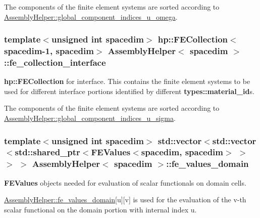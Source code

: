 The components of the finite element systems are sorted according to \hyperlink{class_assembly_helper_a6dae4b6ae7934eaec1ad7baff258ce6e}{Assembly\+Helper\+::global\+\_\+component\+\_\+indices\+\_\+u\+\_\+omega}. 
\subsubsection[{\texorpdfstring{fe\+\_\+collection\+\_\+interface}{fe_collection_interface}}]{\setlength{\rightskip}{0pt plus 5cm}template$<$unsigned int spacedim$>$ {\bf hp\+::\+F\+E\+Collection}$<$spacedim-\/1, spacedim$>$ {\bf Assembly\+Helper}$<$ spacedim $>$\+::fe\+\_\+collection\+\_\+interface\hspace{0.3cm}{\ttfamily [private]}}\hypertarget{class_assembly_helper_a8b4d224a9ecd2e926a8860829874d2a1}{}\label{class_assembly_helper_a8b4d224a9ecd2e926a8860829874d2a1}
{\bf hp\+::\+F\+E\+Collection} for interface. This contains the finite element systems to be used for different interface portions identified by different {\bf types\+::material\+\_\+id}s.

The components of the finite element systems are sorted according to \hyperlink{class_assembly_helper_a992a53a1fcac8a393ca53fb8d504bdfe}{Assembly\+Helper\+::global\+\_\+component\+\_\+indices\+\_\+u\+\_\+sigma}. 
\subsubsection[{\texorpdfstring{fe\+\_\+values\+\_\+domain}{fe_values_domain}}]{\setlength{\rightskip}{0pt plus 5cm}template$<$unsigned int spacedim$>$ std\+::vector$<$std\+::vector$<$std\+::shared\+\_\+ptr$<${\bf F\+E\+Values}$<$spacedim, spacedim$>$ $>$ $>$ $>$ {\bf Assembly\+Helper}$<$ spacedim $>$\+::fe\+\_\+values\+\_\+domain\hspace{0.3cm}{\ttfamily [private]}}\hypertarget{class_assembly_helper_a904a24f53b66e1c1ef89f1bb7989eb32}{}\label{class_assembly_helper_a904a24f53b66e1c1ef89f1bb7989eb32}
{\bf F\+E\+Values} objects needed for evaluation of scalar functionals on domain cells.

\hyperlink{class_assembly_helper_a904a24f53b66e1c1ef89f1bb7989eb32}{Assembly\+Helper\+::fe\+\_\+values\+\_\+domain}\mbox{[}{\ttfamily u}\mbox{]}\mbox{[}{\ttfamily v}\mbox{]} is used for the evaluation of the {\ttfamily v-\/th} scalar functional on the domain portion with internal index {\ttfamily u}.

